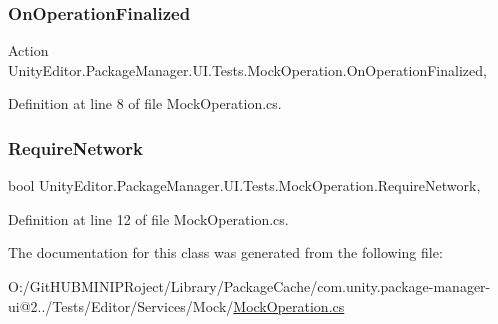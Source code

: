 \subsubsection{\texorpdfstring{OnOperationFinalized}{OnOperationFinalized}}
{\footnotesize\ttfamily Action Unity\+Editor.\+Package\+Manager.\+U\+I.\+Tests.\+Mock\+Operation.\+On\+Operation\+Finalized\hspace{0.3cm}{\ttfamily [add]}, {\ttfamily [remove]}}



Definition at line 8 of file Mock\+Operation.\+cs.

\mbox{\label{class_unity_editor_1_1_package_manager_1_1_u_i_1_1_tests_1_1_mock_operation_ae03c99af48f81df0393929d733098bca}} 
\subsubsection{\texorpdfstring{RequireNetwork}{RequireNetwork}}
{\footnotesize\ttfamily bool Unity\+Editor.\+Package\+Manager.\+U\+I.\+Tests.\+Mock\+Operation.\+Require\+Network\hspace{0.3cm}{\ttfamily [get]}, {\ttfamily [set]}}



Definition at line 12 of file Mock\+Operation.\+cs.



The documentation for this class was generated from the following file\+:\begin{DoxyCompactItemize}
\item 
O\+:/\+Git\+H\+U\+B\+M\+I\+N\+I\+P\+Roject/\+Library/\+Package\+Cache/com.\+unity.\+package-\/manager-\/ui@2../\+Tests/\+Editor/\+Services/\+Mock/\mbox{\hyperlink{_mock_operation_8cs}{Mock\+Operation.\+cs}}\end{DoxyCompactItemize}
